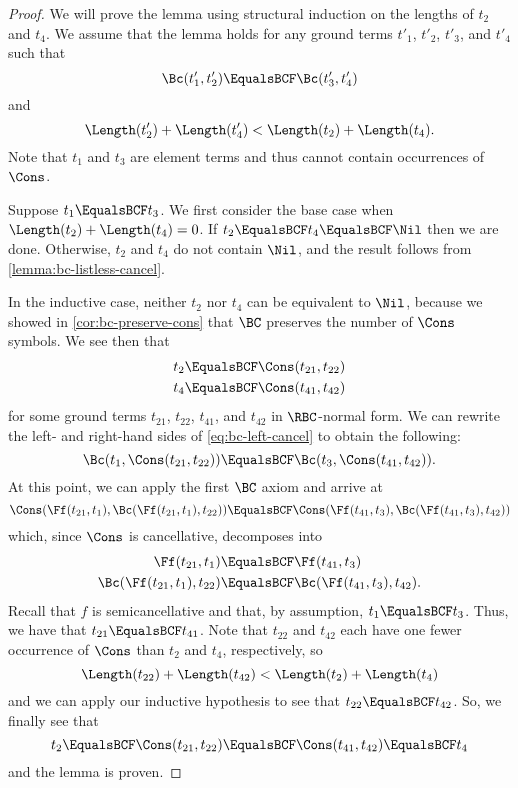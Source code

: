\begin{proof}
    We will prove the lemma using structural induction on the lengths of $t_2$
    and $t_4$. We assume that the lemma holds for any ground terms
    $t'_1$, $t'_2$, $t'_3$, and $t'_4$ such that
    \[\Bc(t'_1, t'_2) \EqualsBCF \Bc(t'_3, t'_4)\]
    and
    \[\Length(t'_2) + \Length(t'_4) < \Length(t_2) + \Length(t_4).\]
    Note that $t_1$ and $t_3$ are element terms and thus cannot contain
    occurrences of $\Cons$.

    Suppose $t_1 \EqualsBCF t_3$. We first consider the base case when
    $\Length(t_2) + \Length(t_4) = 0$. If $t_2 \EqualsBCF t_4 \EqualsBCF \Nil$
    then we are done. Otherwise, $t_2$ and $t_4$ do not contain $\Nil$, and
    the result follows from \cref{lemma:bc-listless-cancel}.

    In the inductive case, neither $t_2$ nor $t_4$ can be equivalent to $\Nil$,
    because we showed in \cref{cor:bc-preserve-cons} that $\BC$ preserves the
    number of $\Cons$ symbols. We see then that
    \begin{align*}
        t_2 &\EqualsBCF \Cons(t_{21}, t_{22}) \\
        t_4 &\EqualsBCF \Cons(t_{41}, t_{42})
    \end{align*}
    for some ground terms $t_{21}$, $t_{22}$, $t_{41}$, and $t_{42}$ in
    $\RBC$-normal form. We can rewrite the left- and right-hand sides of
    \cref{eq:bc-left-cancel} to obtain the following:
    \[\Bc(t_1, \Cons(t_{21}, t_{22})) \EqualsBCF \Bc(t_3, \Cons(t_{41}, t_{42})).\]
    At this point, we can apply the first $\BC$ axiom and arrive at
    \[\Cons(\Ff(t_{21}, t_1), \Bc(\Ff(t_{21}, t_1), t_{22})) \EqualsBCF
    \Cons(\Ff(t_{41}, t_3), \Bc(\Ff(t_{41}, t_3), t_{42}))\]
    which, since $\Cons$ is cancellative, decomposes into
    \begin{align*}
        \Ff(t_{21}, t_1) &\EqualsBCF \Ff(t_{41}, t_3) \\
        \Bc(\Ff(t_{21}, t_1), t_{22}) &\EqualsBCF \Bc(\Ff(t_{41}, t_3), t_{42}).
    \end{align*}
    Recall that $f$ is semicancellative and that, by assumption, $t_1 \EqualsBCF
    t_3$. Thus, we have that $t_{21} \EqualsBCF t_{41}$. Note that $t_{22}$ and
    $t_{42}$ each have one fewer occurrence of $\Cons$ than $t_2$ and $t_4$,
    respectively, so
    \[\Length(t_{22}) + \Length(t_{42}) < \Length(t_2) + \Length(t_4)\]
    and we can apply our inductive hypothesis to see that $t_{22} \EqualsBCF
    t_{42}$. So, we finally see that
    \[t_2 \EqualsBCF \Cons(t_{21}, t_{22}) \EqualsBCF \Cons(t_{41}, t_{42}) \EqualsBCF t_4\]
    and the lemma is proven.
\end{proof}

